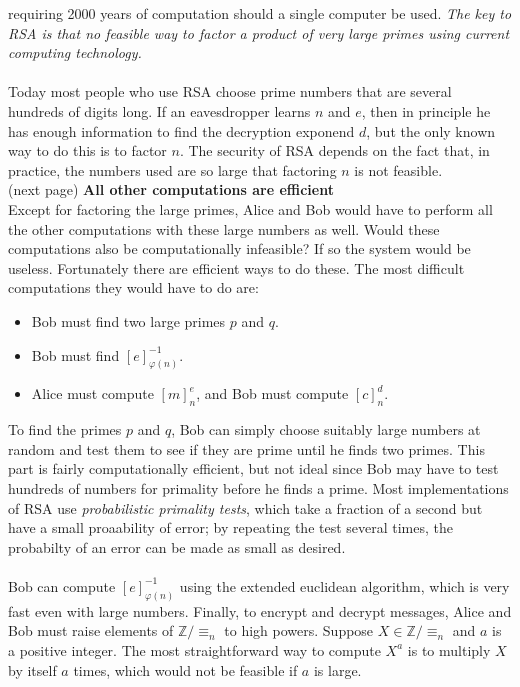 \documentclass{report}
\theoremstyle{definition}
\begin{document}
requiring 2000 years of computation should a single computer be used. \textit{The key to RSA is that no feasible way to factor a product of very 
large primes using current computing technology.}\\
\vspace{1mm}\\
Today most people who use RSA choose prime numbers that are several hundreds of digits long. If an eavesdropper learns $n$ and $e$, then
in principle he has enough information to find the decryption exponend $d$, but the only known way to do this is to factor $n$. The 
security of RSA depends on the fact that, in practice, the numbers used are so large that factoring $n$ is not feasible.\\
(next page)\newpage
\noindent\textbf{All other computations are efficient}\\
Except for factoring the large primes, Alice and Bob would have to perform all the other computations with these large numbers as well. 
Would these computations also be computationally infeasible? If so the system would be useless. Fortunately there are efficient ways to do these.
The most difficult computations they would have to do are:
\begin{itemize}
\item Bob must find two large primes $p$ and $q$. 
\item Bob must find $[e]^{-1}_{\varphi(n)}$.
\item Alice must compute $[m]^e_n$, and Bob must compute $[c]^d_n$.
\end{itemize}
To find the primes $p$ and $q$, Bob can simply choose suitably large numbers at random and test them to see if they are prime until he finds two 
primes. This part is fairly computationally efficient, but not ideal since Bob may have to test hundreds of numbers for primality before he finds 
a prime. Most implementations of RSA use \textit{probabilistic primality tests}, which take a fraction of a second but have a small proaability of 
error; by repeating the test several times, the probabilty of an error can be made as small as desired.\\
\vspace{1mm}\\
Bob can compute $[e]^{-1}_{\varphi(n)}$ using the extended euclidean algorithm, which is very fast even with large numbers. Finally, to encrypt
and decrypt messages, Alice and Bob must raise elements of $\mathbb Z/\equiv_n$ to high powers. Suppose $X\in\mathbb Z/\equiv_n$ and $a$ is a
positive integer. The most straightforward way to compute $X^a$ is to multiply $X$ by itself $a$ times, which would not be feasible if $a$ is large.
\end{document}

